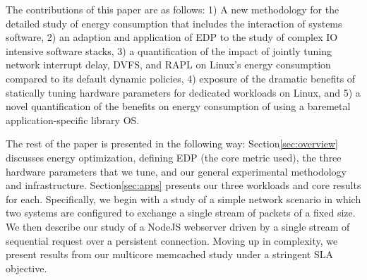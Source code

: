 The contributions of this paper are as follows: 1) A new methodology for the detailed study of energy consumption that includes the interaction of systems software, 2) an adaption and application of EDP to the study of complex IO intensive software stacks, 3) a quantification of the impact of jointly tuning network interrupt delay, DVFS, and RAPL on Linux's energy consumption compared to its default dynamic policies, 4) exposure of the dramatic benefits of statically tuning hardware parameters for dedicated workloads on Linux, and 5) a novel quantification of the benefits on energy consumption of using a baremetal application-specific library OS.


The rest of the paper is presented in the following way: Section\ref{sec:overview} discusses energy optimization, defining EDP (the core metric used), the three hardware parameters that we tune, and our general experimental methodology and infrastructure. Section\ref{sec:apps} presents our three workloads and core results for each.  Specifically, we begin with a study of a simple network scenario in which two systems are configured to exchange a single stream of packets of a fixed size.  We then describe our study of a NodeJS webserver driven by a single stream of sequential request over a persistent connection.  Moving up in complexity, we present results from our multicore memcached study under a stringent SLA objective. 
